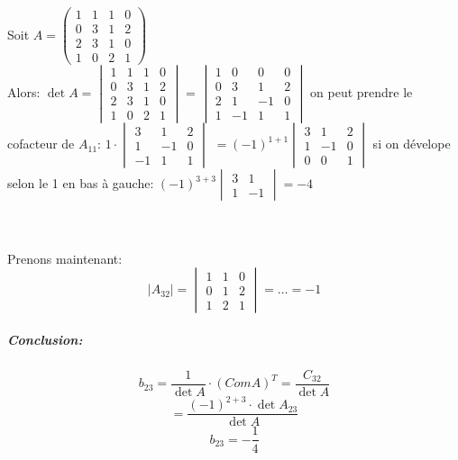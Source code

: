 \begin{exemple}

    Soit $A = \begin{pmatrix}
        1 & 1 & 1 & 0\\
        0 & 3 & 1 & 2\\
        2 & 3 & 1 & 0 \\
        1 & 0 & 2 & 1
    \end{pmatrix}$
\\
Alors: $\det A = \begin{vmatrix}
        1 & 1 & 1 & 0\\
        0 & 3 & 1 & 2\\
        2 & 3 & 1 & 0 \\
        1 & 0 & 2 & 1
\end{vmatrix}$ = $\begin{vmatrix}
        1 & 0 & 0 & 0\\
        0 & 3 & 1 & 2\\
        2 & 1 & -1 & 0 \\
        1 & -1 & 1 & 1
        \end{vmatrix}$ \hspace{0.4cm} on peut prendre le cofacteur de $A_{11}$: 
        $1\cdot \begin{vmatrix}
        3 & 1 & 2\\
        1 & -1 & 0 \\
        -1 & 1 & 1
        \end{vmatrix}$
        $=(-1)^{1+1} \begin{vmatrix}
            3 & 1 & 2 \\
            1 & -1 & 0 \\
            0 & 0 & 1
        \end{vmatrix}$ si on dévelope selon le 1 en bas à gauche:
        $  (-1)^{3+3} \begin{vmatrix}
            3 & 1 \\
            1 & -1
        \end{vmatrix} = -4$

        \\
        \\
        Prenons maintenant:
        \[|A_{32}| = \begin{vmatrix}
            1 & 1 & 0 \\
            0 & 1 & 2\\
            1 & 2 & 1
        \end{vmatrix} = \dots = -1\]
        \subparagraph{Conclusion:} 
        \[b_{23} = \frac{1}{\det A}\cdot(ComA)^T = \frac{C_{32}}{\det A}\]
        \[= \frac{(-1)^{2+3}\cdot \det A_{23}}{\det A}\]
        \[b_{23} = -\frac{1}{4}\]
\end{exemple}
